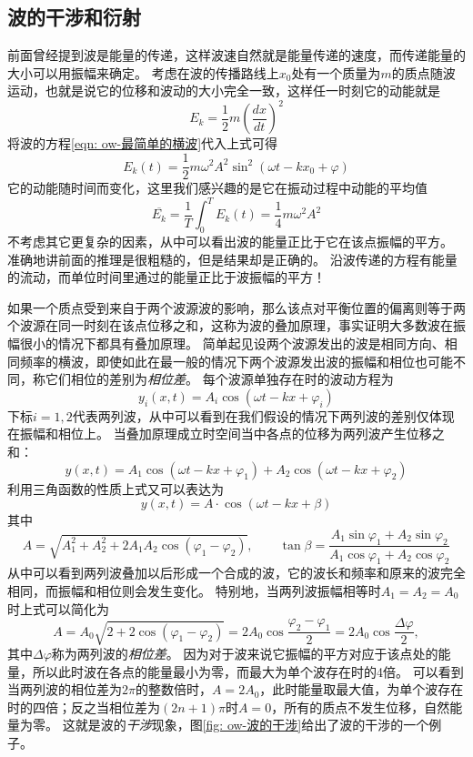 \subsection{波的干涉和衍射}
前面曾经提到波是能量的传递，这样波速自然就是能量传递的速度，而传递能量的大小可以用振幅来确定。
考虑在波的传播路线上$x_0$处有一个质量为$m$的质点随波运动，也就是说它的位移和波动的大小完全一致，这样任一时刻它的动能就是
\begin{equation}
E_k = \frac{1}{2}m\left(\frac{dx}{dt}\right)^2
\end{equation}
将波的方程\ref{eqn: ow-最简单的横波}代入上式可得
\begin{equation}
E_k(t)= \frac{1}{2}m\omega^2A^2\sin^2(\omega t-kx_0+\varphi)
\end{equation}
它的动能随时间而变化，这里我们感兴趣的是它在振动过程中动能的平均值
\begin{equation}
\overline{E_k} = \frac{1}{T}\int_0^T E_k(t) = \frac{1}{4}m\omega^2A^2
\end{equation}
不考虑其它更复杂的因素，从中可以看出波的能量正比于它在该点振幅的平方。
准确地讲前面的推理是很粗糙的，但是结果却是正确的。
沿波传递的方程有能量的流动，而单位时间里通过的能量正比于波振幅的平方！

如果一个质点受到来自于两个波源波的影响，那么该点对平衡位置的偏离则等于两个波源在同一时刻在该点位移之和，这称为波的叠加原理，事实证明大多数波在振幅很小的情况下都具有叠加原理。
简单起见设两个波源发出的波是相同方向、相同频率的横波，即使如此在最一般的情况下两个波源发出波的振幅和相位也可能不同，称它们相位的差别为\emph{相位差}。
每个波源单独存在时的波动方程为
\begin{equation}
y_i (x,t)= A_i\cos(\omega t-kx+\varphi_i)
\end{equation}
下标$i=1,2$代表两列波，从中可以看到在我们假设的情况下两列波的差别仅体现在振幅和相位上。
当叠加原理成立时空间当中各点的位移为两列波产生位移之和：
\begin{equation}
y(x,t) =  A_1\cos(\omega t-kx+\varphi_1)+ A_2\cos(\omega t-kx+\varphi_2)
\end{equation}
利用三角函数的性质上式又可以表达为
\[
y(x,t) = A \cdot \cos(\omega t-kx+\beta)
\]
其中
\begin{equation}
A = \sqrt{A_1^2+A_2^2+2A_1A_2\cos(\varphi_1-\varphi_2)},\qquad \tan\beta = \frac{A_1\sin\varphi_1+A_2\sin\varphi_2}{A_1\cos\varphi_1+A_2\cos\varphi_2}
\end{equation}
从中可以看到两列波叠加以后形成一个合成的波，它的波长和频率和原来的波完全相同，而振幅和相位则会发生变化。
特别地，当两列波振幅相等时$A_1=A_2=A_0$时上式可以简化为
\[
A = A_0\sqrt{2+2\cos(\varphi_1-\varphi_2)} = 2A_0\cos\frac{\varphi_2-\varphi_1}{2} = 2A_0\cos\frac{\Delta \varphi}{2} ,
\]
其中$\Delta \varphi$称为两列波的\emph{相位差}。
 因为对于波来说它振幅的平方对应于该点处的能量，所以此时波在各点的能量最小为零，而最大为单个波存在时的4倍。
可以看到当两列波的相位差为$2\pi$的整数倍时，$A=2A_0$，此时能量取最大值，为单个波存在时的四倍；反之当相位差为$(2n+1)\pi$时$A=0$，所有的质点不发生位移，自然能量为零。
这就是波的\emph{干涉}现象，图\ref{fig: ow-波的干涉}给出了波的干涉的一个例子。

